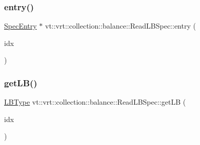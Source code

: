 \mbox{\label{structvt_1_1vrt_1_1collection_1_1balance_1_1_read_l_b_spec_af9e1e7f7ea03e6a7bc06d38c2ca28544}} 
\subsubsection{\texorpdfstring{entry()}{entry()}}
{\footnotesize\ttfamily \hyperlink{structvt_1_1vrt_1_1collection_1_1balance_1_1_spec_entry}{Spec\+Entry} $\ast$ vt\+::vrt\+::collection\+::balance\+::\+Read\+L\+B\+Spec\+::entry (\begin{DoxyParamCaption}\item[{\hyperlink{namespacevt_1_1vrt_1_1collection_1_1balance_a72a5e0d9936ddf57f8e6c64e0e9fd123}{Spec\+Index} const \&}]{idx }\end{DoxyParamCaption})\hspace{0.3cm}{\ttfamily [static]}}

\mbox{\label{structvt_1_1vrt_1_1collection_1_1balance_1_1_read_l_b_spec_a55d8e971ad0821c272aeb3c20455c389}} 
\subsubsection{\texorpdfstring{get\+L\+B()}{getLB()}}
{\footnotesize\ttfamily \hyperlink{namespacevt_1_1vrt_1_1collection_1_1balance_ac4f99693509affcc67db182d4aad9b5c}{L\+B\+Type} vt\+::vrt\+::collection\+::balance\+::\+Read\+L\+B\+Spec\+::get\+LB (\begin{DoxyParamCaption}\item[{\hyperlink{namespacevt_1_1vrt_1_1collection_1_1balance_a72a5e0d9936ddf57f8e6c64e0e9fd123}{Spec\+Index} const \&}]{idx }\end{DoxyParamCaption})\hspace{0.3cm}{\ttfamily [static]}}

